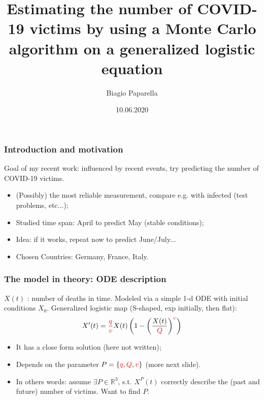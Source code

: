 \documentclass{beamer}
\title{Estimating the number of COVID-19 victims by using a Monte Carlo
algorithm on a generalized logistic equation}
\author{Biagio Paparella}
\institute{Oberseminar - Institute for Numerical Simulation - Bonn}
\date{10.06.2020}
\begin{document}
\frame{\titlepage}

\begin{frame}
	\frametitle{Introduction and motivation}

	Goal of my recent work: influenced by recent events,
	try predicting the number of COVID-19 victims.

	\begin{itemize}
\item <1-> (Possibly) the most reliable measurement, compare e.g. with infected
	(test problems, etc...);
\item <2-> Studied time span: April to predict May (stable conditions);
\item <3-> Idea: if it works, repeat now to predict June/July...
\item <4-> Chosen Countries: Germany, France, Italy.
	\end{itemize}


\end{frame}

\begin{frame}
	\frametitle{The model in theory: ODE description}
	$X(t)$ : number of deaths in time. Modeled via 
	a simple 1-d ODE with initial conditions $X_0$. 
	Generalized logistic map 
	(S-shaped, exp initially, then flat):
		\begin{equation}
			X'(t) = \frac{\color{red}{\color{red}{q}}}
			{\color{red}{v}} X(t)
			\left ( 1 - \left( \frac{X(t)}{\color{red}{Q}} \right)^
			{\color{red}{v}}\right )
\end{equation}

	\begin{itemize}
		\item<1-> It has a close form solution (here not written);
		\item<2-> Depends on the parameter 
			$P = \{\textcolor{red}{q}, 
				\textcolor{red}{Q}, 
				\textcolor{red}{v}\}$
			(more next slide). 
	\item<3-> In others words: assume $\exists P \in \mathbb{R}^3$,
		s.t. $X^P(t)$ correctly describe the (past and future) 
			number of victims. Want to find $P$.
	\end{itemize}
\end{frame}
\end{document}
